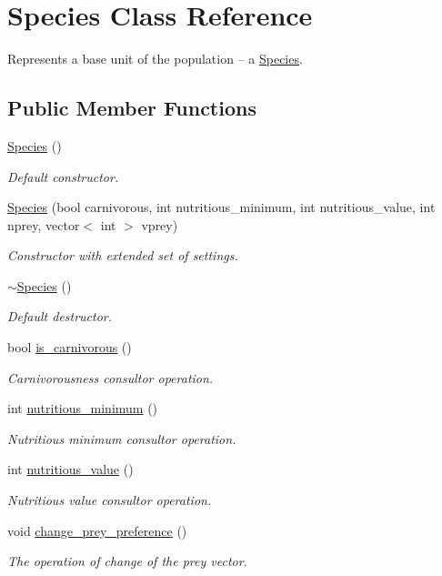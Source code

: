 \hypertarget{class_species}{\section{Species Class Reference}
\label{class_species}
}


Represents a base unit of the population – a \hyperlink{class_species}{Species}.  


\subsection*{Public Member Functions}
\begin{DoxyCompactItemize}
\item 
\hyperlink{class_species_abb0f8e3208b0cc676157b7dff837c0be}{Species} ()
\begin{DoxyCompactList}\small\item\em Default constructor. \end{DoxyCompactList}\item 
\hyperlink{class_species_a66517a4f8a2507e555d8e05db47c549c}{Species} (bool carnivorous, int nutritious\-\_\-minimum, int nutritious\-\_\-value, int nprey, vector$<$ int $>$ vprey)
\begin{DoxyCompactList}\small\item\em Constructor with extended set of settings. \end{DoxyCompactList}\item 
\hyperlink{class_species_af36f93648e2dedc2f05b6fb0c067f35e}{$\sim$\-Species} ()
\begin{DoxyCompactList}\small\item\em Default destructor. \end{DoxyCompactList}\item 
bool \hyperlink{class_species_ae9693788c20d6ba84b8dd950f1e90296}{is\-\_\-carnivorous} ()
\begin{DoxyCompactList}\small\item\em Carnivorousness consultor operation. \end{DoxyCompactList}\item 
int \hyperlink{class_species_a1ff07d6d5a5d03978d2c8df16f49b8d7}{nutritious\-\_\-minimum} ()
\begin{DoxyCompactList}\small\item\em Nutritious minimum consultor operation. \end{DoxyCompactList}\item 
int \hyperlink{class_species_abea0a065bd95c118115b6647fccb87a0}{nutritious\-\_\-value} ()
\begin{DoxyCompactList}\small\item\em Nutritious value consultor operation. \end{DoxyCompactList}\item 
void \hyperlink{class_species_a1292192418e6b58ff78a539b3742f2fc}{change\-\_\-prey\-\_\-preference} ()
\begin{DoxyCompactList}\small\item\em The operation of change of the prey vector. \end{DoxyCompactList}\end{DoxyCompactItemize}


